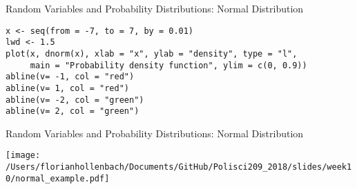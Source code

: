 \documentclass[presentation]{beamer}
\begin{document}
\begin{frame}[fragile,shrink=30,label={sec:orga6fb294}]{Random Variables and Probability Distributions: Normal Distribution}
 \begin{verbatim}
x <- seq(from = -7, to = 7, by = 0.01)
lwd <- 1.5
plot(x, dnorm(x), xlab = "x", ylab = "density", type = "l",
     main = "Probability density function", ylim = c(0, 0.9))
abline(v= -1, col = "red")
abline(v= 1, col = "red")
abline(v= -2, col = "green")
abline(v= 2, col = "green")
\end{verbatim}
\end{frame}



\begin{frame}[label={sec:orgdbed054}]{Random Variables and Probability Distributions: Normal Distribution}
\begin{center}
\texttt{[image: /Users/florianhollenbach/Documents/GitHub/Polisci209\_2018/slides/week10/normal\_example.pdf]}
\end{center}
\end{frame}
\end{document}
